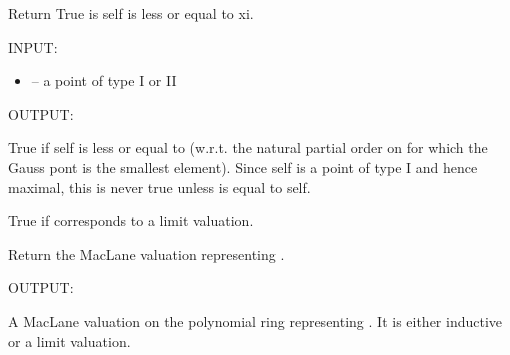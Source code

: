 \documentclass[letterpaper,10pt,english]{sphinxmanual}
\begin{document}
\begin{fulllineitems}
\begin{fulllineitems}
\end{fulllineitems}


\begin{fulllineitems}
\label{berkovich_line:mclf.berkovich.berkovich_line.TypeIPointOnBerkovichLine.is_leq}
Return True is self is less or equal to xi.

INPUT:
\begin{itemize}
\item {} 
 -- a point of type I or II

\end{itemize}

OUTPUT:

True if self is less or equal to  (w.r.t. the natural
partial order on  for which the Gauss pont is the smallest element).
Since self is a point of type I and hence maximal, this is never true
unless  is equal to self.

\end{fulllineitems}


\begin{fulllineitems}
\label{berkovich_line:mclf.berkovich.berkovich_line.TypeIPointOnBerkovichLine.is_limit_point}
True if  corresponds to a limit valuation.

\end{fulllineitems}


\begin{fulllineitems}
\label{berkovich_line:mclf.berkovich.berkovich_line.TypeIPointOnBerkovichLine.pseudovaluation_on_polynomial_ring}
Return the MacLane valuation representing .

OUTPUT:

A MacLane valuation on the polynomial ring  representing .
It is either inductive or a limit valuation.

\end{fulllineitems}


\end{fulllineitems}
\end{document}
